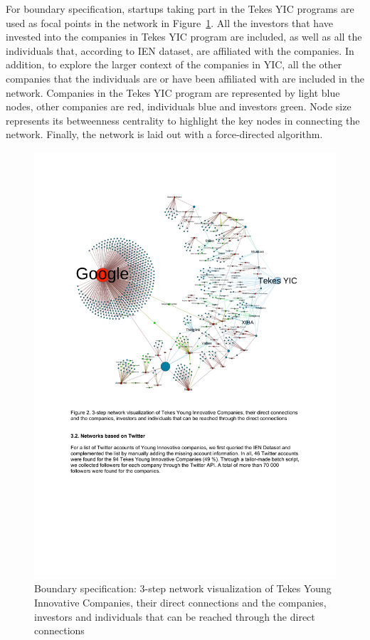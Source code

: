 For boundary specification, startups taking part in the Tekes YIC programs are used as focal points in the network in Figure~\ref{fig:tekes-yic-3-step}. All the investors that have invested into the companies in Tekes YIC program are included, as well as all the individuals that, according to IEN dataset, are affiliated with the companies. In addition, to explore the larger context of the companies in YIC, all the other companies that the individuals are or have been affiliated with are included in the network. Companies in the Tekes YIC program are represented by light blue nodes, other companies are red, individuals blue and investors green. Node size represents its betweenness centrality to highlight the key nodes in connecting the network. Finally, the network is laid out with a force-directed algorithm.

\begin{figure}[htb]
\centering
\includegraphics[width=12cm]{figure/Tekes-YIC-3-step.pdf}
\caption{Boundary specification: 3-step network visualization of Tekes Young Innovative Companies, their direct connections and the companies, investors and individuals that can be reached through the direct connections
 \citep{Huhtamaki2012NetworksFinland}}
\label{fig:tekes-yic-3-step}
\end{figure}

